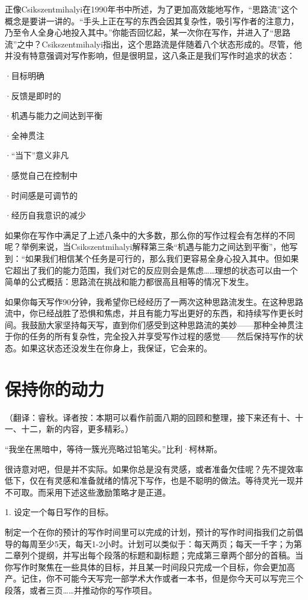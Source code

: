 \documentclass{ctexart}
\begin{document}
正像Csikszentmihalyi在1990年书中所述，为了更加高效能地写作，“思路流”这个概念是要讲一讲的。“手头上正在写的东西会因其复杂性，吸引写作者的注意力，乃至令人全身心地投入其中。”你能否回忆起，某一次你在写作，并进入了“思路流”之中？Csikszentmihalyi指出，这个思路流是伴随着八个状态形成的。尽管，他并没有特意强调对写作影响，但是很明显，这八条正是我们写作时追求的状态：

·目标明确

·反馈是即时的

·机遇与能力之间达到平衡

·全神贯注

·“当下”意义非凡

·感觉自己在控制中

·时间感是可调节的

·经历自我意识的减少

如果你在写作中满足了上述八条中的大多数，那么你的写作过程会有怎样的不同呢？举例来说，当Csikszentmihalyi解释第三条“机遇与能力之间达到平衡”，他写到：“如果我们相信某个任务是可行的，那么我们更容易全身心投入其中。但如果它超出了我们的能力范围，我们对它的反应则会是焦虑……理想的状态可以由一个简单的公式概括：思路流在挑战和能力都很高且相等的情况下发生。

如果你每天写作90分钟，我希望你已经经历了一两次这种思路流发生。在这种思路流中，你已经战胜了恐惧和焦虑，并且有能力写出更好的东西，和持续写作更长时间。我鼓励大家坚持每天写，直到你们感受到这种思路流的美妙——那种全神贯注于你的任务的所有复杂性，完全投入并享受写作过程的感觉——然后保持写作的状态。如果这状态还没发生在你身上，我保证，它会来的。

\section{保持你的动力}
（翻译：睿秋。译者按：本期可以看作前面八期的回顾和整理，接下来还有十、十一、十二，新的内容，更多精彩。）

“我坐在黑暗中，等待一簇光亮略过铅笔尖。”比利·柯林斯。

很诗意对吧，但是并不实际。如果你总是没有灵感，或者准备欠佳呢？先不提效率低下，仅在有灵感和准备就绪的情况下写作，也是不聪明的做法。等待灵光一现并不可取。而采用下述这些激励策略才是正道。

1. 设定一个每日写作的目标。

制定一个在你的预计的写作时间里可以完成的计划，预计的写作时间指我们之前倡导的每周至少5天，每天1-2小时。计划可以类似于：每天两页；每天一千字；为第二章列个提纲，并写出每个段落的标题和副标题；完成第三章两个部分的首稿。当你写作时聚焦在一些具体的目标，并且某一时间段只完成一个目标，你会更加高产。记住，你不可能今天写完一部学术大作或者一本书，但是你今天可以写完三个段落，或者三页……并推动你的写作项目。
\end{document}
